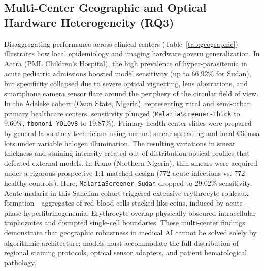 \documentclass[a4paper,11pt]{article}
\begin{document}
\subsection{Multi-Center Geographic and Optical Hardware Heterogeneity (RQ3)}
Disaggregating performance across clinical centers (Table~\ref{tab:geographic}) illustrates how local epidemiology and imaging hardware govern generalization.
In Accra (PML Children's Hospital), the high prevalence of hyper-parasitemia in acute pediatric admissions boosted model sensitivity (up to $66.92\%$ for Sudan), but specificity collapsed due to severe optical vignetting, lens aberrations, and smartphone camera sensor flare around the periphery of the circular field of view.
In the Adeleke cohort (Osun State, Nigeria), representing rural and semi-urban primary healthcare centers, sensitivity plunged (\texttt{MalariaScreener-Thick} to $9.60\%$, \texttt{fbononi-YOLOv8} to $19.87\%$). Primary health center slides were prepared by general laboratory technicians using manual smear spreading and local Giemsa lots under variable halogen illumination. The resulting variations in smear thickness and staining intensity created out-of-distribution optical profiles that defeated external models.
In Kano (Northern Nigeria), thin smears were acquired under a rigorous prospective 1:1 matched design (772 acute infections vs. 772 healthy controls). Here, \texttt{MalariaScreener-Sudan} dropped to $29.02\%$ sensitivity. Acute malaria in this Sahelian cohort triggered extensive erythrocyte rouleaux formation---aggregates of red blood cells stacked like coins, induced by acute-phase hyperfibrinogenemia. Erythrocyte overlap physically obscured intracellular trophozoites and disrupted single-cell boundaries. These multi-center findings demonstrate that geographic robustness in medical AI cannot be solved solely by algorithmic architecture; models must accommodate the full distribution of regional staining protocols, optical sensor adapters, and patient hematological pathology.
\end{document}
